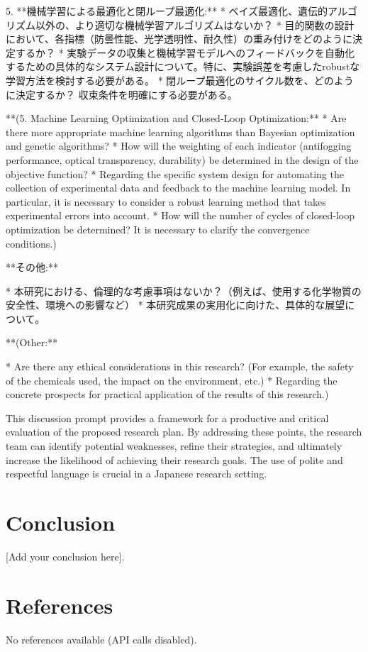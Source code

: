 \documentclass{article}
\begin{document}
5.  **機械学習による最適化と閉ループ最適化:**
    *   ベイズ最適化、遺伝的アルゴリズム以外の、より適切な機械学習アルゴリズムはないか？
    *   目的関数の設計において、各指標（防曇性能、光学透明性、耐久性）の重み付けをどのように決定するか？
    *   実験データの収集と機械学習モデルへのフィードバックを自動化するための具体的なシステム設計について。特に、実験誤差を考慮したrobustな学習方法を検討する必要がある。
    *   閉ループ最適化のサイクル数を、どのように決定するか？ 収束条件を明確にする必要がある。

    **(5. Machine Learning Optimization and Closed-Loop Optimization:**
    *   Are there more appropriate machine learning algorithms than Bayesian optimization and genetic algorithms?
    *   How will the weighting of each indicator (antifogging performance, optical transparency, durability) be determined in the design of the objective function?
    *   Regarding the specific system design for automating the collection of experimental data and feedback to the machine learning model. In particular, it is necessary to consider a robust learning method that takes experimental errors into account.
    *   How will the number of cycles of closed-loop optimization be determined? It is necessary to clarify the convergence conditions.)

**その他:**

*   本研究における、倫理的な考慮事項はないか？（例えば、使用する化学物質の安全性、環境への影響など）
*   本研究成果の実用化に向けた、具体的な展望について。

**(Other:**

*   Are there any ethical considerations in this research? (For example, the safety of the chemicals used, the impact on the environment, etc.)
*   Regarding the concrete prospects for practical application of the results of this research.)

This discussion prompt provides a framework for a productive and critical evaluation of the proposed research plan. By addressing these points, the research team can identify potential weaknesses, refine their strategies, and ultimately increase the likelihood of achieving their research goals.  The use of polite and respectful language is crucial in a Japanese research setting.


\section{Conclusion}
[Add your conclusion here].

\section{References}
No references available (API calls disabled).
\end{document}

